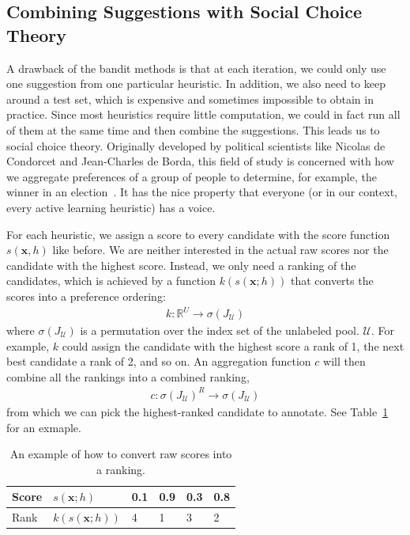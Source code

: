 \documentclass[fleqn,10pt,lineno]{wlpeerj} %
\newcommand{\Unlabeled}{\mathcal{U}}
\begin{document}
\subsection{Combining Suggestions with Social Choice Theory}

A drawback of the bandit methods is that at each iteration, we could only use
one suggestion from one particular heuristic. In addition, we also need to keep
around a test set, which is expensive and sometimes impossible to obtain in
practice. Since most heuristics require little computation, we could in fact
run all of them at the same time and then combine the suggestions. This leads
us to social choice theory. Originally developed by political scientists like
Nicolas de Condorcet and Jean-Charles de Borda, this field of study is
concerned with how we aggregate preferences of a group of people to determine,
for example, the winner in an election~\citep{list13}. It has the nice property
that everyone (or in our context, every active learning heuristic) has a voice.

For each heuristic, we assign a score to every candidate with the score
function $s(\bm{x}, h)$ like before. We are neither interested in the actual
raw scores nor the candidate with the highest score. Instead, we only need
a ranking of the candidates, which is achieved by a function $k(s(\bm{x}; h))$
that converts the scores into a preference ordering:
	\begin{align}
		k : \mathbb{R}^{U} \rightarrow \sigma(J_\Unlabeled)
	\end{align}
where $\sigma(J_\Unlabeled)$ is a permutation over the index set of the
unlabeled pool. $\Unlabeled$. For example, $k$ could assign the candidate with
the highest score a rank of 1, the next best candidate a rank of 2, and so on.
An aggregation function $c$ will then combine all the rankings into a combined
ranking,
    \begin{align}
		c : \sigma(J_\Unlabeled)^{R} \rightarrow \sigma(J_\Unlabeled)
    \end{align}
from which we can pick the highest-ranked candidate to annotate. See
Table~\ref{tab:rank} for an exmaple.

\begin{table}[htbp]
	\caption {An example of how to convert raw scores into a ranking.}
	          \label{tab:rank}
	\centering
	\begin{tabular}{llllll}
		\toprule
		Score & $s(\bm{x}; h)$  &  0.1 & 0.9 & 0.3 & 0.8 \\
		\midrule
		Rank & $k(s(\bm{x}; h))$ & 4 & 1 & 3 & 2 \\
		\bottomrule
	\end{tabular}
\end{table}
\end{document}
